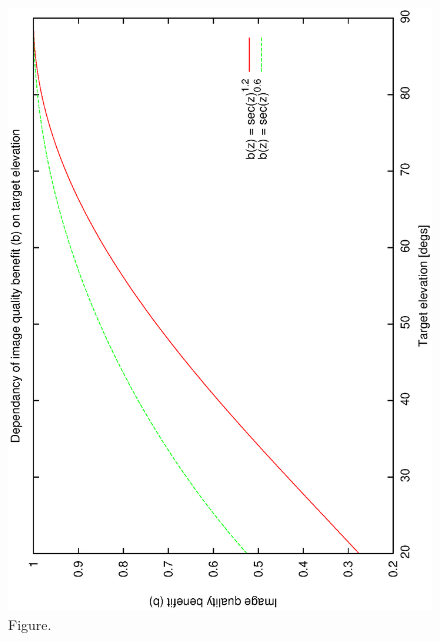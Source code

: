 \documentclass[12pt,a4paper]{article}
\begin{document}
\begin{figure}[htbp]
 \begin{center}
  \includegraphics[scale=1.0, angle=0]{figures/baz_plot.eps}
 \end{center}
  \caption[Figure.]
{Figure.}
\end{figure}
\clearpage
\end{document}
